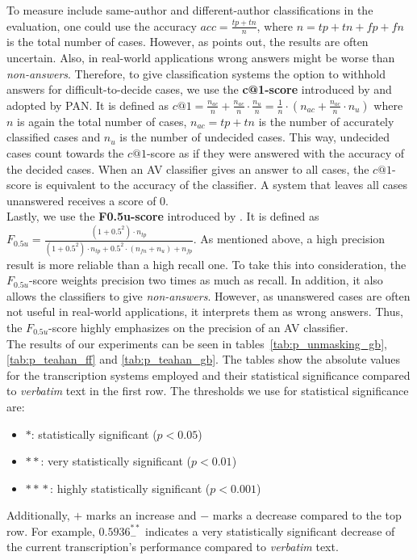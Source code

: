 To measure include same-author and different-author classifications in the evaluation, one could use the accuracy $acc = \frac{tp+tn}{n}$, where $n = tp+tn+fp+fn$ is the total number of cases.
However, as \cite{bevendorff2019unmaskingShortTexts} points out, the results are often uncertain.
Also, in real-world applications wrong answers might be worse than \textit{non-answers}.
Therefore, to give classification systems the option to withhold answers for difficult-to-decide cases, we use the \textbf{c@1-score} introduced by \cite{penas2011c_at_1} and adopted by PAN.
It is defined as $c@1 = \frac{n_{ac}}{n}+\frac{n_{ac}}{n}\cdot{}\frac{n_u}{n} = \frac{1}{n}\cdot{}\left(n_{ac}+\frac{n_{ac}}{n}\cdot{}n_u\right)$ where $n$ is again the total number of cases, $n_{ac} = tp+tn$ is the number of accurately classified cases and $n_u$ is the number of undecided cases.
This way, undecided cases count towards the $c@1$-score as if they were answered with the accuracy of the decided cases.
When an AV classifier gives an answer to all cases, the $c@1$-score is equivalent to the accuracy of the classifier.
A system that leaves all cases unanswered receives a score of 0.\\
Lastly, we use the \textbf{F0.5u-score} introduced by \cite{bevendorff2019unmaskingShortTexts}.
It is defined as $F_{0.5u} = \frac{(1+0.5^2)\cdot{}n_{tp}}{(1+0.5^2)\cdot{}n_{tp}+0.5^2\cdot{}(n_{fn}+n_u)+n_{fp}}$.
As mentioned above, a high precision result is more reliable than a high recall one.
To take this into consideration, the $F_{0.5u}$-score weights precision two times as much as recall.
In addition, it also allows the classifiers to give \textit{non-answers}.
However, as unanswered cases are often not useful in real-world applications, it interprets them as wrong answers.
Thus, the $F_{0.5u}$-score highly emphasizes on the precision of an AV classifier.\\

The results of our experiments can be seen in tables~\ref{tab:p_unmasking_gb}, \ref{tab:p_teahan_ff} and \ref{tab:p_teahan_gb}.
The tables show the absolute values for the transcription systems employed and their statistical significance compared to \textit{verbatim} text in the first row.
The thresholds we use for statistical significance are:
\begin{itemize}
    \item $*$: statistically significant ($p < 0.05$)
    \item $*\! *$: very statistically significant ($p < 0.01$)
    \item $*\! *\! *$: highly statistically significant ($p < 0.001$)
\end{itemize}
Additionally, $+$ marks an increase and $-$ marks a decrease compared to the top row.
For example, $0.5936^{*\! *}_{-}$ indicates a very statistically significant decrease of the current transcription's performance compared to \textit{verbatim} text.

